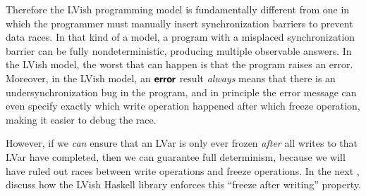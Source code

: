 Therefore the LVish programming model is fundamentally different from
one in which the programmer must manually insert synchronization
barriers to prevent data races.  In that kind of a model, a program
with a misplaced synchronization barrier can be fully
nondeterministic, producing multiple observable answers.  In the LVish
model, the worst that can happen is that the program raises an error.
Moreover, in the LVish model, an $\textbf{\textsf{error}}$ result \emph{always} means
that there is an undersynchronization bug in the program, and in
principle the error message can even specify exactly which write
operation happened after which freeze operation, making it easier to
debug the race.

However, if we \emph{can} ensure that an LVar is only ever frozen
\emph{after} all writes to that LVar have completed, then we can
guarantee full determinism, because we will have ruled out races
between write operations and freeze operations.  In the next ,
 discuss how the LVish Haskell library enforces this ``freeze after
writing'' property.

